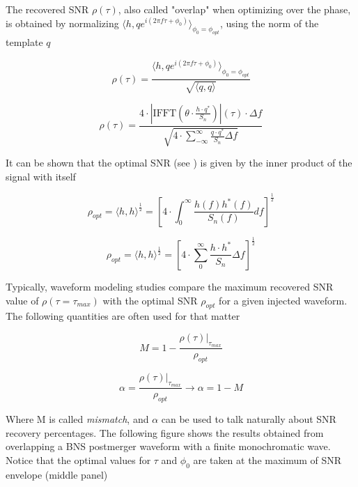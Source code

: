 The recovered SNR $\rho(\tau)$, also called "overlap" when optimizing over the phase, is obtained by normalizing $\langle h,q e^{i(2\pi f \tau + \phi_0)} \rangle_{\phi_0=\phi_{opt}}$, using the norm of the template $q$

\begin{equation}
\rho (\tau) = \frac{\langle h,q e^{i(2\pi f \tau + \phi_0)} \rangle_{\phi_0=\phi_{opt}}}{\sqrt{\langle q,q \rangle}}
\end{equation}


\begin{equation}\label{eq:17}
\rho (\tau)= 
\frac{
4\cdot \left| \mathrm{IFFT}\left(  \theta \cdot \frac{h \cdot q^{*} }{S_n}\right)\right| (\tau) \cdot \Delta f
}
{
\sqrt{4\cdot \sum_{-\infty}^{\infty} \frac{q\cdot q^*}{S_n} \Delta f}
}
\end{equation}

It can be shown that the optimal SNR (see \cite[chapter 5]{Sathyaprakash:2009xs}) is given by the inner product of the signal with itself

\begin{equation}
\rho_{opt} = \langle h,h \rangle^{\frac{1}{2}} = \left[4\cdot\int_{0}^{\infty} \frac{h(f)h^{*}(f)}{S_n(f)}df\right]^{\frac{1}{2}}
\end{equation}

\begin{equation}\label{sopt}
\rho_{opt} = \langle h,h \rangle^{\frac{1}{2}} = \left[4\cdot\sum_{0}^{\infty} \frac{ h\cdot h^{*}}{S_n}\Delta f\right]^{\frac{1}{2}}
\end{equation}

Typically, waveform modeling studies compare the maximum recovered SNR value of $\rho(\tau=\tau_{max})$ with the optimal SNR $\rho_{opt}$ for a given injected waveform. The following quantities are often used for that matter 


\begin{equation}
M = 1-\frac{\rho(\tau)|_{\tau_{max}}}{\rho_{opt}}
\end{equation}

\begin{equation}\label{ff}
\alpha = \frac{\rho(\tau)|_{\tau_{max}}}{\rho_{opt}} \rightarrow \alpha = 1-M
\end{equation}

Where M is called \textit{mismatch}, and $\alpha$ can be used to talk naturally about SNR recovery percentages. The following figure shows the results obtained from overlapping a BNS postmerger waveform with a finite monochromatic wave. Notice that  the optimal values for $\tau$ and $\phi_0$ are taken at the maximum of SNR envelope (middle panel)


